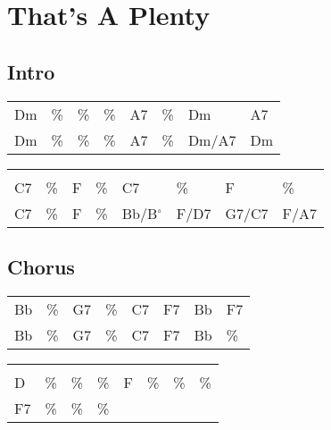 \section{That's A Plenty}


\subsection*{Intro}


\begin{tabular}{l l l l l l l l}
Dm & \% & \% & \% & A7 & \% & Dm & A7 \\ 
Dm & \% & \% & \% & A7 & \% & Dm/A7 & Dm \\ 
\end{tabular}


\begin{tabular}{l l l l l l l l}
\\ \\ 
C7 & \% & F & \% & C7 & \% & F & \% \\ 
C7 & \% & F & \% & Bb/B$^{\circ}$ & F/D7 & G7/C7 & F/A7 \\ 
\end{tabular}


\subsection*{Chorus}


\begin{tabular}{l l l l l l l l}
Bb & \% & G7 & \% & C7 & F7 & Bb & F7 \\ 
Bb & \% & G7 & \% & C7 & F7 & Bb & \% \\ 
\end{tabular}


\begin{tabular}{l l l l l l l l}
\\ \\ 
D & \% & \% & \% & F & \% & \% & \% \\ 
F7 & \% & \% & \% \\ 
\end{tabular}


